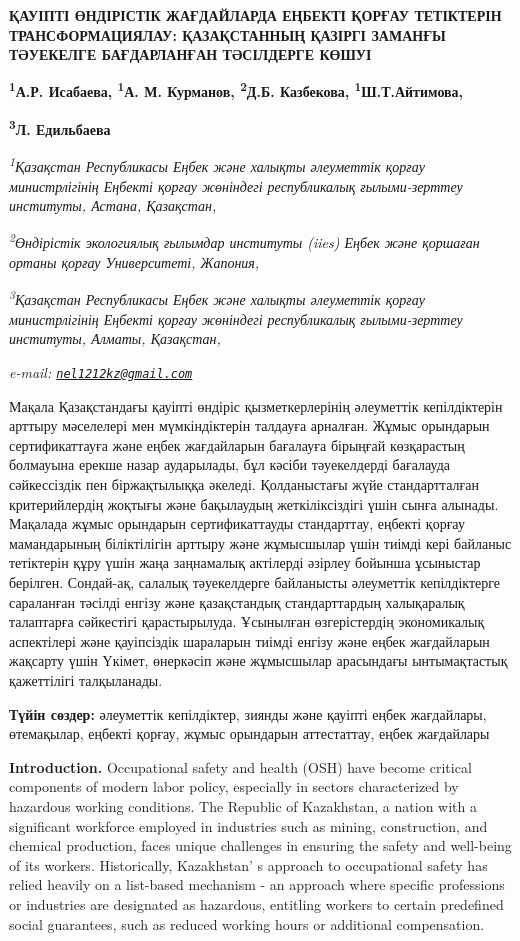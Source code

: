 {\bfseries ҚАУІПТІ ӨНДІРІСТІК ЖАҒДАЙЛАРДА ЕҢБЕКТІ ҚОРҒАУ ТЕТІКТЕРІН
ТРАНСФОРМАЦИЯЛАУ: ҚАЗАҚСТАННЫҢ ҚАЗІРГІ ЗАМАНҒЫ ТӘУЕКЕЛГЕ БАҒДАРЛАНҒАН
ТӘСІЛДЕРГЕ КӨШУІ}

{\bfseries \textsuperscript{1}А.Р. Исабаева\textsuperscript{\envelope },
\textsuperscript{1}А. М. Курманов, \textsuperscript{2}Д.Б. Казбекова,
\textsuperscript{1}Ш.Т.Айтимова,}

{\bfseries \textsuperscript{3}Л. Едильбаева}

\emph{\textsuperscript{1}Қазақстан Республикасы Еңбек және халықты
әлеуметтік қорғау министрлігінің Еңбекті қорғау жөніндегі республикалық
ғылыми-зерттеу институты, Астана, Қазақстан,}

\emph{\textsuperscript{2}Өндірістік экологиялық ғылымдар институты
(iies) Еңбек және қоршаған ортаны қорғау Университеті, Жапония,}

\emph{\textsuperscript{3}Қазақстан Республикасы Еңбек және халықты
әлеуметтік қорғау министрлігінің Еңбекті қорғау жөніндегі республикалық
ғылыми-зерттеу институты, Алматы, Қазақстан,}

\emph{e-mail:
\href{mailto:nel1212kz@gmail.com}{\nolinkurl{nel1212kz@gmail.com}}}

Мақала Қазақстандағы қауіпті өндіріс қызметкерлерінің әлеуметтік
кепілдіктерін арттыру мәселелері мен мүмкіндіктерін талдауға арналған.
Жұмыс орындарын сертификаттауға және еңбек жағдайларын бағалауға
бірыңғай көзқарастың болмауына ерекше назар аударылады, бұл кәсіби
тәуекелдерді бағалауда сәйкессіздік пен біржақтылыққа әкеледі.
Қолданыстағы жүйе стандартталған критерийлердің жоқтығы және бақылаудың
жеткіліксіздігі үшін сынға алынады. Мақалада жұмыс орындарын
сертификаттауды стандарттау, еңбекті қорғау мамандарының біліктілігін
арттыру және жұмысшылар үшін тиімді кері байланыс тетіктерін құру үшін
жаңа заңнамалық актілерді әзірлеу бойынша ұсыныстар берілген. Сондай-ақ,
салалық тәуекелдерге байланысты әлеуметтік кепілдіктерге сараланған
тәсілді енгізу және қазақстандық стандарттардың халықаралық талаптарға
сәйкестігі қарастырылуда. Ұсынылған өзгерістердің экономикалық
аспектілері және қауіпсіздік шараларын тиімді енгізу және еңбек
жағдайларын жақсарту үшін Үкімет, өнеркәсіп және жұмысшылар арасындағы
ынтымақтастық қажеттілігі талқыланады.

{\bfseries Түйін сөздер:} әлеуметтік кепілдіктер, зиянды және қауіпті еңбек
жағдайлары, өтемақылар, еңбекті қорғау, жұмыс орындарын аттестаттау,
еңбек жағдайлары

{\bfseries Introduction.} Occupational safety and health (OSH) have become
critical components of modern labor policy, especially in sectors
characterized by hazardous working conditions. The Republic of
Kazakhstan, a nation with a significant workforce employed in industries
such as mining, construction, and chemical production, faces unique
challenges in ensuring the safety and well-being of its workers.
Historically, Kazakhstan' s approach to occupational
safety has relied heavily on a list-based mechanism - an approach where
specific professions or industries are designated as hazardous,
entitling workers to certain predefined social guarantees, such as
reduced working hours or additional compensation.

